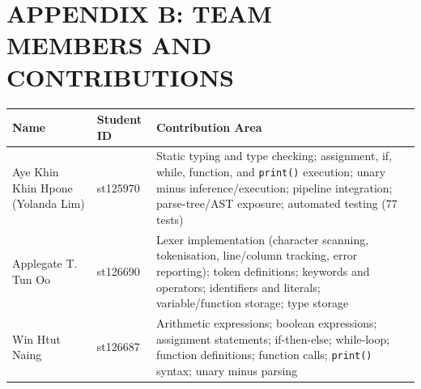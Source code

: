 \chapter*{APPENDIX B: TEAM MEMBERS AND CONTRIBUTIONS}

\vspace{1cm}

\begin{table}[h!]
\centering
\renewcommand{\arraystretch}{1.5}
\small
\begin{tabular}{@{} p{3.8cm} p{1.8cm} p{8.0cm} @{}}
\toprule
\textbf{Name} & \textbf{Student ID} & \textbf{Contribution Area} \\
\midrule
Aye Khin Khin Hpone (Yolanda Lim) & st125970 & Static typing and type checking; assignment, if, while, function, and \texttt{print()} execution; unary minus inference/execution; pipeline integration; parse-tree/AST exposure; automated testing (77 tests) \\
Applegate T. Tun Oo & st126690 & Lexer implementation (character scanning, tokenisation, line/column tracking, error reporting); token definitions; keywords and operators; identifiers and literals; variable/function storage; type storage \\
Win Htut Naing & st126687 & Arithmetic expressions; boolean expressions; assignment statements; if-then-else; while-loop; function definitions; function calls; \texttt{print()} syntax; unary minus parsing \\
\bottomrule
\end{tabular}
\end{table}

